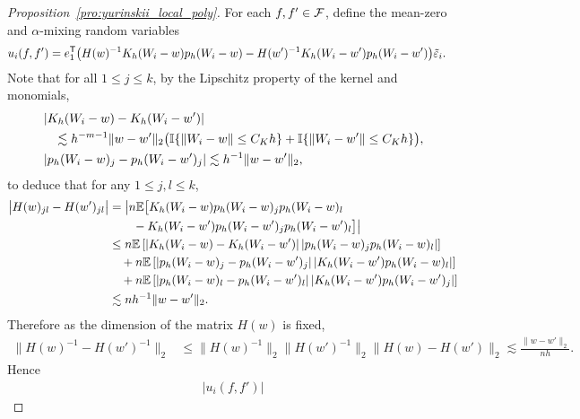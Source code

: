\begin{proof}[Proposition~\ref{pro:yurinskii_local_poly}]

  For each $f, f' \in \mathcal{F}$,
  define the mean-zero and $\alpha$-mixing random variables
  \begin{align*}
    u_i(f,f')
    &=
    e_1^{\mathsf{T}}
    \big(
      H(w)^{-1} K_h(W_i-w) p_h(W_i-w)
      - H(w')^{-1} K_h(W_i-w') p_h(W_i-w')
    \big)
    \tilde\varepsilon_i.
  \end{align*}
  Note that for all $1 \leq j \leq k$,
  by the Lipschitz property of the kernel and monomials,
  \begin{align*}
    &\left|
    K_h(W_i-w) - K_h(W_i-w')
    \right| \\
    &\quad\lesssim
    h^{-m-1}
    \|w-w'\|_2
    \big(
      \mathbb{I}\{\|W_i-w\| \leq C_K h\}
      + \mathbb{I}\{\|W_i-w'\| \leq C_K h\}
    \big), \\
    &\left|
    p_h(W_i-w)_j - p_h(W_i-w')_j
    \right|
    \lesssim
    h^{-1}
    \|w-w'\|_2,
  \end{align*}
  to deduce that for any $1 \leq j,l \leq k$,
  \begin{align*}
    \big| H(w)_{j l} - H(w')_{j l} \big|
    &=
    \big|
    n \mathbb{E}\big[
      K_h(W_i-w) p_h(W_i-w)_j p_h(W_i-w)_l \\
      &\qquad-
      K_h(W_i-w') p_h(W_i-w')_j p_h(W_i-w')_l
    \big]
    \big| \\
    &\leq
    n\mathbb{E}\left[
      \left|
      K_h(W_i-w) - K_h(W_i-w')
      \right|
      \left|
      p_h(W_i-w)_j
      p_h(W_i-w)_l
      \right|
    \right] \\
    &\quad+
    n\mathbb{E}\left[
      \left|
      p_h(W_i-w)_j - p_h(W_i-w')_j
      \right|
      \left|
      K_h(W_i-w')
      p_h(W_i-w)_l
      \right|
    \right] \\
    &\quad+
    n\mathbb{E}\left[
      \left|
      p_h(W_i-w)_l - p_h(W_i-w')_l
      \right|
      \left|
      K_h(W_i-w')
      p_h(W_i-w')_j
      \right|
    \right] \\
    &\lesssim
    n h^{-1}\|w-w'\|_2.
  \end{align*}
  Therefore as the dimension of the matrix $H(w)$ is fixed,
  \begin{align*}
    \big\| H(w)^{-1} - H(w')^{-1} \big\|_2
    &\leq
    \big\| H(w)^{-1}\big\|_2
    \big\| H(w')^{-1}\big\|_2
    \big\| H(w) - H(w') \big\|_2
    \lesssim
    \frac{\|w-w'\|_2}{n h}.
  \end{align*}
  Hence
  \begin{align*}
    \big| u_i(f,f') \big|

\end{align*}
\end{proof}
